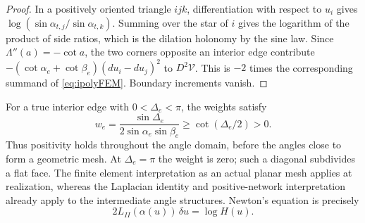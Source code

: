 \begin{proof}
In a positively oriented triangle $ijk$, differentiation with respect
to $u_i$ gives
$\log(\sin\alpha_{t,j}/\sin\alpha_{t,k})$.
Summing over the star of $i$ gives the logarithm of the product of
side ratios, which is the dilation holonomy by the sine law.
Since $\Lambda''(a)=-\cot a$, the two corners opposite an interior
edge contribute
$-(\cot\alpha_e+\cot\beta_e)(du_i-du_j)^2$ to $D^2\mathcal V$.
This is $-2$ times the corresponding summand of
\eqref{eq:ipolyFEM}. Boundary increments vanish.
\end{proof}

For a true interior edge with $0<\Delta_e<\pi$, the weights satisfy
\begin{equation}
 w_e=\frac{\sin\Delta_e}{2\sin\alpha_e\sin\beta_e}
       \ge\cot(\Delta_e/2)>0.
 \label{eq:ipolyWeightLower}
\end{equation}
Thus positivity holds throughout the angle domain, before the angles
close to form a geometric mesh. At $\Delta_e=\pi$ the weight is zero;
such a diagonal subdivides a flat face. The finite element interpretation
as an actual planar mesh applies at realization, whereas the Laplacian
identity and positive-network interpretation already apply to the
intermediate angle structures. Newton's equation is precisely
\begin{equation}
 2L_{II}(\alpha(u))\,\delta u=\log H(u).
 \label{eq:ipolyNewton}
\end{equation}


